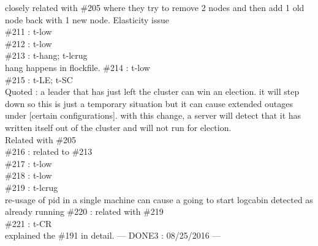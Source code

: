 closely related with \#205 where they try to remove 2 nodes and
then add 1 old node back with 1 new node. Elasticity issue\\
\#211 : t-low\\
\#212 : t-low\\
\#213 : t-hang; t-lcrug\\
hang happens in flockfile.
\#214 : t-low\\
\#215 : t-LE; t-SC\\
Quoted : a leader that has just left the cluster can win an
election. it will step down so this is just a temporary
situation but it can cause extended outages under
[certain configurations]. with this change, a server
will detect that it has written itself out of the
cluster and will not run for election.\\
Related with \#205\\
\#216 : related to \#213\\
\#217 : t-low\\
\#218 : t-low\\
\#219 : t-lcrug\\
re-usage of pid in a single machine can
cause a going to start logcabin detected as already running
\#220 : related with \#219\\
\#221 : t-CR\\
explained the \#191 in detail.
--- DONE3 : 08/25/2016 ---